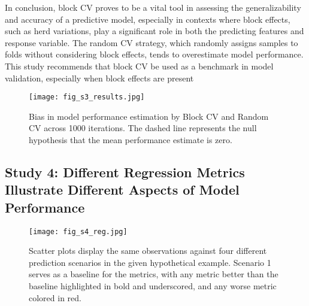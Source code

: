In conclusion, block CV proves to be a vital tool in assessing the generalizability and accuracy of a predictive model, especially in contexts where block effects, such as herd variations, play a significant role in both the predicting features and response variable. The random CV strategy, which randomly assigns samples to folds without considering block effects, tends to overestimate model performance. This study recommends that block CV be used as a benchmark in model validation, especially when block effects are present

\begin{figure}[h]
    \centering
    \texttt{[image: fig\_s3\_results.jpg]}
    \caption{Bias in model performance estimation by Block CV and Random CV across 1000 iterations. The dashed line represents the null hypothesis that the mean performance estimate is zero.}
    \label{fig:s3_results}
\end{figure}

\subsection{Study 4: Different Regression Metrics Illustrate Different Aspects of Model Performance}

\begin{figure}[h]
    \centering
    \texttt{[image: fig\_s4\_reg.jpg]}
    \caption{Scatter plots display the same observations against four different prediction scenarios in the given hypothetical example. Scenario 1 serves as a baseline for the metrics, with any metric better than the baseline highlighted in bold and underscored, and any worse metric colored in red.}
    \label{fig:s4_reg}
\end{figure}

